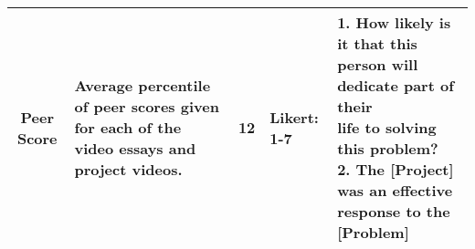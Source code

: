 \begin{landscape}
\begin{table}[!htb]
\begin{tabularx}{1.6\textwidth}{c | X | c | l | X }
    \hline
    \hspace{3pt} Peer Score & Average percentile of peer scores given for each of the video essays and project videos. & 12 & Likert: 1-7  & \makecell[l]{1. How likely is it that this person will dedicate part of their \\ life to solving this problem? \\ 2. The [Project] was an effective response to the [Problem]} \\
    \hline
    \bottomrule
    \end{tabularx}
    \label{tab:measure_details}
    \end{table}
    \hfill
    \end{landscape}
